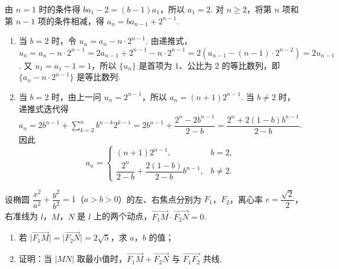 \begin{solution}
由 \(n=1\) 时的条件得 \(ba_1-2=(b-1)a_1\)，所以 \(a_1=2\). 对 \(n\geqslant2\)，将第 \(n\) 项和第 \(n-1\) 项的条件相减，得 \(a_n=ba_{n-1}+2^{n-1}\).

\begin{enumerate}
\item 当 \(b=2\) 时，令 \(u_n=a_n-n\cdot2^{n-1}\). 由递推式，
\(u_n=a_n-n\cdot2^{n-1}=2a_{n-1}+2^{n-1}-n\cdot2^{n-1}=2\left(a_{n-1}-(n-1)\cdot2^{n-2}\right)=2u_{n-1}\). 又 \(u_1=a_1-1=1\)，所以 \(\{u_n\}\) 是首项为 \(1\)、公比为 \(2\) 的等比数列，即 \(\{a_n-n\cdot2^{n-1}\}\) 是等比数列.
\item 当 \(b=2\) 时，由上一问 \(u_n=2^{n-1}\)，所以 \(a_n=(n+1)2^{n-1}\). 当 \(b\ne2\) 时，递推式迭代得
\(a_n=2b^{n-1}+\sum_{k=2}^{n}b^{n-k}2^{k-1}=2b^{n-1}+\dfrac{2^n-2b^{n-1}}{2-b}=\dfrac{2^n+2(1-b)b^{n-1}}{2-b}\). 因此
\[
a_n=
\begin{cases}
(n+1)2^{n-1}, & b=2,\\
\dfrac{2^n}{2-b}+\dfrac{2(1-b)}{2-b}b^{n-1}, & b\ne2.
\end{cases}
\]
\end{enumerate}
\end{solution}

\begin{problem}
设椭圆 \(\dfrac{x^2}{a^2}+\dfrac{y^2}{b^2}=1\)（\(a>b>0\)）的左、右焦点分别为 \(F_1\)，\(F_2\)，离心率 \(e=\dfrac{\sqrt2}{2}\)，右准线为 \(l\)，\(M\)，\(N\) 是 \(l\) 上的两个动点，\(\overrightarrow{F_1M}\cdot\overrightarrow{F_2N}=0\).

\begin{enumerate}
\item 若 \(\lvert\overrightarrow{F_1M}\rvert=\lvert\overrightarrow{F_2N}\rvert=2\sqrt5\)，求 \(a\)，\(b\) 的值；
\item 证明：当 \(\lvert MN\rvert\) 取最小值时，\(\overrightarrow{F_1M}+\overrightarrow{F_2N}\) 与 \(\overrightarrow{F_1F_2}\) 共线.
\end{enumerate}

\begin{center}
\end{center}
\end{problem}

